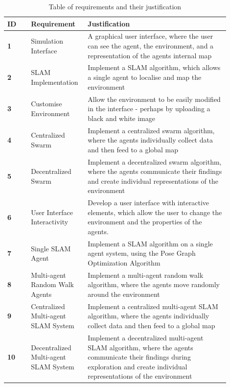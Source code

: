 \documentclass[12pt]{article}
\begin{document}
\begin{table}[H]
    \centering
    \begin{tabular}{|p{0.1\linewidth}|p{0.2\linewidth}|p{0.6\linewidth}|}
        \hline
        \textbf{ID} &
        \textbf{Requirement} &
        \textbf{Justification}\\
        \hline
        \textbf{1} &
        Simulation Interface &
        A graphical user interface, where the user can see the agent, the environment, and a representation of
            the agents internal map\\
        \hline
        \textbf{2} &
        SLAM Implementation &
        Implement a SLAM algorithm, which allows a single agent to localise and map the environment\\
        \hline
        \textbf{3} &
        Customise Environment &
        Allow the environment to be easily modified in the interface - perhaps by uploading a black and white image\\
        \hline
        \textbf{4} &
        Centralized Swarm &
        Implement a centralized swarm algorithm, where the agents individually collect data and then feed to a global map\\
        \hline
        \textbf{5} &
        Decentralized Swarm &
        Implement a decentralized swarm algorithm, where the agents communicate their findings and create individual representations
            of the environment\\
        \hline
        \textbf{6} &
        User Interface Interactivity &
        Develop a user interface with interactive elements, which allow the user to change the environment and the properties of the agents.\\
        \hline
        \textbf{7} &
        Single SLAM Agent &
        Implement a SLAM algorithm on a single agent system, using the Pose Graph Optimization Algorithm\\
        \hline
        \textbf{8} &
        Multi-agent Random Walk Agents &
        Implement a multi-agent random walk algorithm, where the agents move randomly around the environment\\
        \hline
        \textbf{9} &
        Centralized Multi-agent SLAM System &
        Implement a centralized multi-agent SLAM algorithm, where the agents individually collect data and then feed to a global map\\
        \hline
        \textbf{10} &
        Decentralized Multi-agent SLAM System &
        Implement a decentralized multi-agent SLAM algorithm, where the agents communicate their findings during exploration and create individual representations of the environment\\
        \hline
    \end{tabular}
    \caption{Table of requirements and their justification}\label{tab:requirements_table}
\end{table} \\
\end{document}
